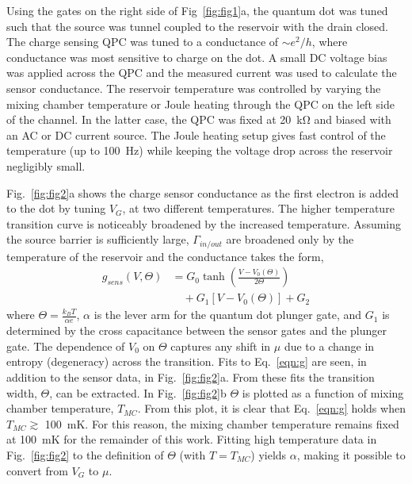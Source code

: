\documentclass[twocolumn,showpacs,preprintnumbers,amsmath,amssymb,pra,aps,superscriptaddress]{revtex4-1}
\begin{document}
Using the gates on the right side of Fig~\ref{fig:fig1}a, the quantum dot was tuned such that the source was tunnel coupled to the reservoir with the drain closed. The charge sensing QPC was tuned to a conductance of ${\sim}e^2/h$, where conductance was most sensitive to charge on the dot. A small DC voltage bias was applied across the QPC and the measured current was used to calculate the sensor conductance. The reservoir temperature was controlled by varying the mixing chamber temperature or Joule heating through the QPC on the left side of the channel. In the latter case, the QPC was fixed at \SI{20}{\kilo\ohm} and biased with an AC or DC current source. The Joule heating setup gives fast control of the temperature (up to \SI{100}{\hertz}) while keeping the voltage drop across the reservoir negligibly small.

Fig.~\ref{fig:fig2}a shows the charge sensor conductance as the first electron is added to the dot by tuning $V_G$, at two different temperatures. The higher temperature transition curve is noticeably broadened by the increased temperature. Assuming the source barrier is sufficiently large, $\Gamma_{in/out}$ are broadened only by the temperature of the reservoir and the conductance takes the form,
%
\begin{align}
\label{eqn:g}
        g_{sens}(V,\Theta) &= G_0 \tanh\left(\frac{V-V_0(\Theta)}{2\Theta}\right)  \\
                        &\quad + G_1\left[V-V_0(\Theta)\right] + G_2 \nonumber
\end{align}
%
where $\Theta = \frac{k_B T}{\alpha e}$, $\alpha$ is the lever arm for the quantum dot plunger gate, and $G_1$ is determined by the cross capacitance between the sensor gates and the plunger gate. The dependence of $V_0$ on $\Theta$ captures any shift in $\mu$ due to a change in entropy (degeneracy) across the transition. Fits to Eq.~\ref{eqn:g} are seen, in addition to the sensor data, in Fig.~\ref{fig:fig2}a. From these fits the transition width, $\Theta$, can be extracted. In Fig.~\ref{fig:fig2}b $\Theta$ is plotted as a function of mixing chamber temperature, $T_{MC}$. From this plot, it is clear that Eq.~\ref{eqn:g} holds when $T_{MC}\gtrsim$ \SI{100}{\milli\kelvin}. For this reason, the mixing chamber temperature remains fixed at \SI{100}{\milli\kelvin} for the remainder of this work. Fitting high temperature data in Fig.~\ref{fig:fig2} to the definition of $\Theta$ (with $T=T_{MC}$) yields $\alpha$, making it possible to convert from $V_G$ to $\mu$.
\end{document}
